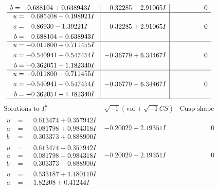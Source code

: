 \documentclass[1p]{elsarticle_modified}
\theoremstyle{definition}
\newcommand{\I}{\sqrt{-1}}
\begin{document}
$$\begin{array}{c|c|c}
\begin{aligned}
b &= \phantom{-}0.688104 + 0.638943 I\end{aligned}
 & -0.32285 - 2.91065 I & \phantom{-0.000000 } 0 \\ \hline\begin{aligned}
u &= \phantom{-}0.685408 - 0.198921 I \\
a &= \phantom{-}0.86930 - 1.39221 I \\
b &= \phantom{-}0.688104 - 0.638943 I\end{aligned}
 & -0.32285 + 2.91065 I & \phantom{-0.000000 } 0 \\ \hline\begin{aligned}
u &= -0.011800 + 0.711455 I \\
a &= -0.540941 + 0.547454 I \\
b &= -0.362051 + 1.182340 I\end{aligned}
 & -0.36779 + 6.34467 I & \phantom{-0.000000 } 0 \\ \hline\begin{aligned}
u &= -0.011800 - 0.711455 I \\
a &= -0.540941 - 0.547454 I \\
b &= -0.362051 - 1.182340 I\end{aligned}
 & -0.36779 - 6.34467 I & \phantom{-0.000000 } 0\\
 \hline 
 \end{array}$$\newpage$$\begin{array}{c|c|c}  
\text{Solutions to }I^u_{1}& \I (\text{vol} + \sqrt{-1}CS) & \text{Cusp shape}\\
 \hline 
\begin{aligned}
u &= \phantom{-}0.613474 + 0.357942 I \\
a &= \phantom{-}0.081798 + 0.984318 I \\
b &= \phantom{-}0.303373 + 0.888900 I\end{aligned}
 & -0.20029 - 2.19351 I & \phantom{-0.000000 } 0 \\ \hline\begin{aligned}
u &= \phantom{-}0.613474 - 0.357942 I \\
a &= \phantom{-}0.081798 - 0.984318 I \\
b &= \phantom{-}0.303373 - 0.888900 I\end{aligned}
 & -0.20029 + 2.19351 I & \phantom{-0.000000 } 0 \\ \hline\begin{aligned}
u &= \phantom{-}0.533187 + 1.180110 I \\
a &= \phantom{-}1.82208 + 0.41244 I \\

\end{aligned}
\end{array}$$
\end{document}
